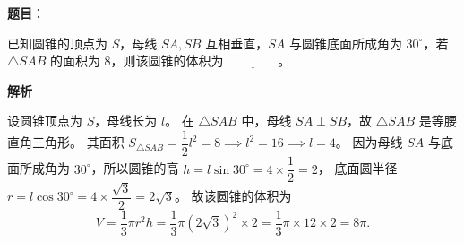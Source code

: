 \begin{answer}

\textbf{题目}：

已知圆锥的顶点为 $S$，母线 $SA,SB$ 互相垂直，$SA$ 与圆锥底面所成角为 $30^\circ$，若 $\triangle SAB$ 的面积为 8，则该圆锥的体积为 $\underline{\qquad\qquad}$。

\textbf{解析}

设圆锥顶点为 $S$，母线长为 $l$。
在 $\triangle SAB$ 中，母线 $SA\perp SB$，故 $\triangle SAB$ 是等腰直角三角形。
其面积 $S_{\triangle SAB} = \dfrac12 l^2 = 8 \implies l^2=16 \implies l=4$。
因为母线 $SA$ 与底面所成角为 $30^\circ$，所以圆锥的高 $h = l\sin 30^\circ = 4\times\dfrac12=2$，
底面圆半径 $r = l\cos 30^\circ = 4\times\dfrac{\sqrt3}{2}=2\sqrt3$。
故该圆锥的体积为
\nopagebreak[4]
\[V = \dfrac13\pi r^2 h = \dfrac13\pi(2\sqrt3)^2\times 2 = \dfrac13\pi\times 12\times 2 = 8\pi.\]


\end{answer}

